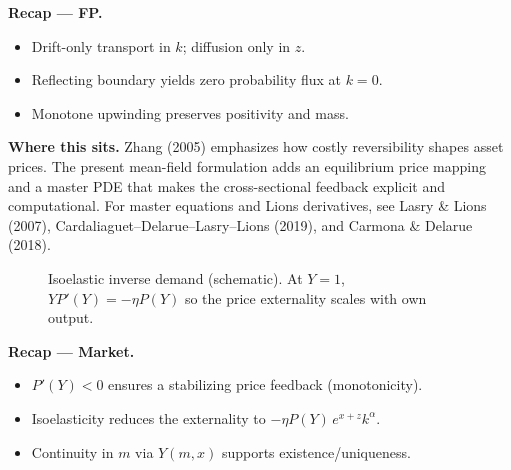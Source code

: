 ﻿\documentclass[11pt,letterpaper,oneside]{article}
\numberwithin{equation}{section}
\newcommand{\1}{\mathbf{1}}
\begin{document}
\begin{tcolorbox}[didacticstyle]
\textbf{Recap --- FP.}
\begin{itemize}[leftmargin=1.15em,itemsep=0.2em]
  \item Drift-only transport in $k$; diffusion only in $z$.
  \item Reflecting boundary yields zero probability flux at $k=0$.
  \item Monotone upwinding preserves positivity and mass.
\end{itemize}
\end{tcolorbox}

\begin{tcolorbox}[literaturestyle]
\textbf{Where this sits.} Zhang (2005) emphasizes how costly reversibility shapes asset prices. The present mean-field formulation adds an equilibrium price mapping and a master PDE that makes the cross-sectional feedback explicit and computational. For master equations and Lions derivatives, see Lasry \& Lions (2007), Cardaliaguet--Delarue--Lasry--Lions (2019), and Carmona \& Delarue (2018).
\end{tcolorbox}

\begin{figure}[ht]
\centering
{}
\caption{Isoelastic inverse demand (schematic). At $Y=1$, $Y P'(Y)=-\eta P(Y)$ so the price externality scales with own output.}
\end{figure}

\begin{tcolorbox}[didacticstyle]
\textbf{Recap --- Market.}
\begin{itemize}[leftmargin=1.15em,itemsep=0.2em]
  \item $P'(Y)<0$ ensures a stabilizing price feedback (monotonicity).
  \item Isoelasticity reduces the externality to $-\eta P(Y)\,e^{x+z}k^\alpha$.
  \item Continuity in $m$ via $Y(m,x)$ supports existence/uniqueness.
\end{itemize}
\end{tcolorbox}
\end{document}
